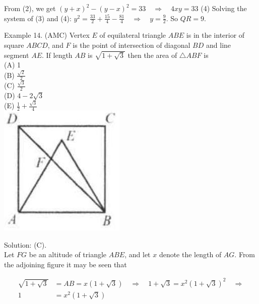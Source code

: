 \documentclass[10pt]{article}
\begin{document}
From (2), we get \((y+x)^{2}-(y-x)^{2}=33 \quad \Rightarrow \quad 4 x y=33\) (4) Solving the system of (3) and (4): \(y^{2}=\frac{33}{2}+\frac{15}{4}-\frac{81}{4} \quad \Rightarrow \quad y=\frac{9}{2}\). So \(Q R=9\).

Example 14. (AMC) Vertex \(E\) of equilateral triangle \(A B E\) is in the interior of square \(A B C D\), and \(F\) is the point of intersection of diagonal \(B D\) and line segment \(A E\). If length \(A B\) is \(\sqrt{1+\sqrt{3}}\) then the area of \(\triangle A B F\) is\\
(A) 1\\
(B) \(\frac{\sqrt{2}}{2}\)\\
(C) \(\frac{\sqrt{3}}{2}\)\\
(D) \(4-2 \sqrt{3}\)\\
(E) \(\frac{1}{2}+\frac{\sqrt{3}}{4}\)\\
\includegraphics[max width=\textwidth, center]{2025_04_17_97bc1f7e44d93c271a88g-083}

Solution: (C).\\
Let \(F G\) be an altitude of triangle \(A B E\), and let \(x\) denote the length of \(A G\). From the adjoining figure it may be seen that

\[
\begin{aligned}
\sqrt{1+\sqrt{3}} & =A B=x(1+\sqrt{3}) \quad \Rightarrow \quad 1+\sqrt{3}=x^{2}(1+\sqrt{3})^{2} \quad \Rightarrow \\
1 & =x^{2}(1+\sqrt{3})
\end{aligned}
\]
\end{document}
